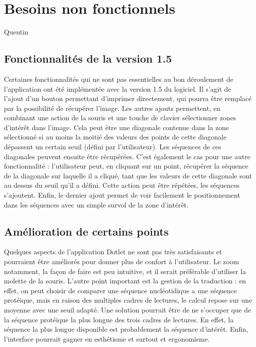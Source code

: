 \documentclass{report}
\begin{document}
\section{Besoins non fonctionnels}
Quentin


\subsection{Fonctionnalités de la version 1.5}
Certaines fonctionnalités qui ne sont pas essentielles au bon déroulement de l'application ont été implémentée avec la version 1.5 du logiciel. Il s'agit de l'ajout d'un bouton permettant d'imprimer directement, qui pourra être remplacé par la possibilité de récupérer l'image. Les autres ajouts permettent, en combinant une action de la souris et une touche de clavier sélectionner zones d'intérêt dans l'image. Cela peut être une diagonale contenue dans la zone sélectionné si au moins la moitié des valeurs des points de cette diagonale dépassent un certain seuil (défini par l'utilisateur). Les séquences de ces diagonales peuvent ensuite être récupérées. C'est également le cas pour une autre fonctionnalité : l'utilisateur peut, en cliquant sur un point, récupérer la séquence de la diagonale sur laquelle il a cliqué, tant que les valeurs de cette diagonale sont au dessus du seuil qu'il a défini. Cette action peut être répétées, les séquences s'ajoutent. Enfin, le dernier ajout permet de voir facilement le positionnement dans les séquences avec un simple survol de la zone d'intérêt.

\subsection{Amélioration de certains points}
Quelques aspects de l'application Dotlet ne sont pas très satisfaisants et pourraient être améliorés pour donner plus de confort à l'utilisateur. Le zoom notamment, la façon de faire est peu intuitive, et il serait préférable d'utiliser la molette de la souris. L'autre point important est la gestion de la traduction : en effet, on peut choisir de comparer une séquence nucléotidique a une séquence protéique, mais en raison des multiples cadres de lectures, le calcul repose sur une moyenne avec une seuil adapté. Une solution pourrait être de ne s'occuper que de la séquence protéique la plus longue des trois cadres de lectures. En effet, la séquence la plus longue disponible est probablement la séquence d'intérêt. Enfin, l'interface pourrait gagner en esthétisme et surtout et ergonomisme.
\end{document}
